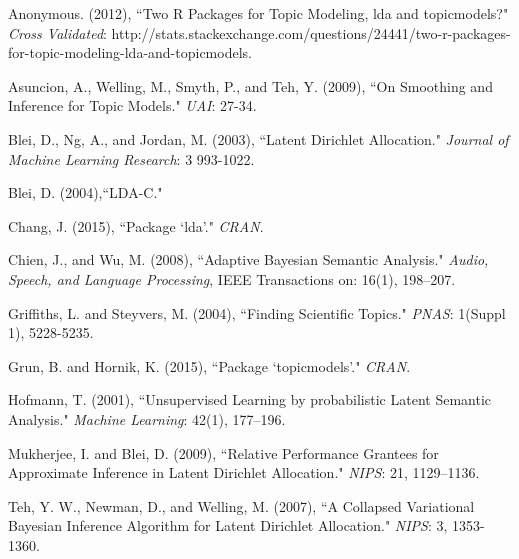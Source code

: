 \documentclass[12pt]{article}
\begin{document}
\begin{thebibliography}{4}
	Anonymous. (2012),
	``Two R Packages for Topic Modeling, lda and topicmodels?" \textit{Cross Validated}: http://stats.stackexchange.com/questions/24441/two-r-packages-for-topic-modeling-lda-and-topicmodels.
	
	Asuncion, A., Welling, M., Smyth, P., and Teh, Y.  (2009),
	``On Smoothing and Inference for Topic Models." 
	\textit{UAI}: 27-34.
	
	Blei, D., Ng, A., and Jordan, M.  (2003),
	``Latent Dirichlet Allocation." 
	\textit{Journal of Machine Learning Research}: 3 993-1022.
	
	Blei, D. (2004),``LDA-C."
	
	Chang, J.  (2015),
	``Package `lda'." 
	\textit{CRAN}.

	Chien, J., and Wu, M.  (2008),
	``Adaptive Bayesian Semantic Analysis." 
	\textit{Audio, Speech, and Language Processing}, IEEE Transactions on: 16(1), 198–207.
		
	Griffiths, L. and Steyvers, M.  (2004),
	``Finding Scientific Topics." 
	\textit{PNAS}: 1(Suppl 1), 5228-5235.
			
	Grun, B. and Hornik, K.  (2015),
	``Package `topicmodels'." 
	\textit{CRAN}.	

	Hofmann, T.  (2001),
	``Unsupervised Learning by probabilistic Latent Semantic Analysis." 
	\textit{Machine Learning}: 42(1), 177–196.
	
	Mukherjee, I. and Blei, D.  (2009),
	``Relative Performance Grantees for Approximate Inference in Latent Dirichlet Allocation." 
	\textit{NIPS}: 21, 1129–1136.

	Teh, Y. W., Newman, D., and Welling, M.  (2007),
	``A Collapsed Variational Bayesian Inference Algorithm for Latent Dirichlet Allocation." 
	\textit{NIPS}: 3, 1353-1360.
\end{thebibliography}
\end{document}
